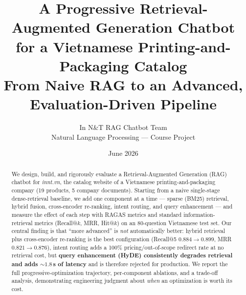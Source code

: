\documentclass[11pt,a4paper]{article}
\title{\textbf{A Progressive Retrieval-Augmented Generation Chatbot\\
for a Vietnamese Printing-and-Packaging Catalog}\\[4pt]
\large From Naive RAG to an Advanced, Evaluation-Driven Pipeline}
\author{In N\&T RAG Chatbot Team\\
\small Natural Language Processing --- Course Project}
\date{June 2026}
\begin{document}
\maketitle

\begin{abstract}
\noindent We design, build, and rigorously evaluate a Retrieval-Augmented
Generation (RAG) chatbot for \textit{innt.vn}, the catalog website of a
Vietnamese printing-and-packaging company (19 products, 5 company documents).
Starting from a naive single-stage dense-retrieval baseline, we add one
component at a time --- sparse (BM25) retrieval, hybrid fusion, cross-encoder
re-ranking, intent routing, and query enhancement --- and measure the effect of
each step with RAGAS metrics \cite{es2023ragas} and standard information-retrieval
metrics (Recall@$k$, MRR, Hit@$k$) on an 80-question Vietnamese test set.
Our central finding is that ``more advanced'' is \emph{not} automatically
better: hybrid retrieval plus cross-encoder re-ranking is the best
configuration (Recall@5 $0.884\!\to\!0.899$, MRR $0.821\!\to\!0.876$), intent
routing adds a 100\% pricing/out-of-scope redirect rate at no retrieval cost,
but \textbf{query enhancement (HyDE) consistently degrades retrieval and adds
${\sim}1.8$\,s of latency} and is therefore rejected for production. We report
the full progressive-optimization trajectory, per-component ablations, and a
trade-off analysis, demonstrating engineering judgment about \emph{when} an
optimization is worth its cost.
\end{abstract}

\tableofcontents
\newpage









\end{document}

